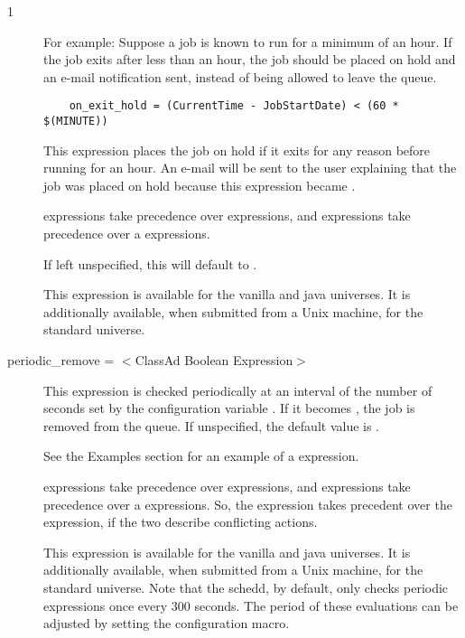 \begin{ManPage}{\label{man-condor-submit}}{1}
\begin{description}
For example:
Suppose a job is known to run for a minimum of an hour.
If the job exits after less than an hour, the job should be placed on
hold and an e-mail notification sent,
instead of being allowed to leave the queue.

\begin{verbatim}
	on_exit_hold = (CurrentTime - JobStartDate) < (60 * $(MINUTE))
\end{verbatim}

This expression places the job on hold if it exits for any reason
before running for an hour. An e-mail will be sent to the user explaining
that the job was placed on hold because this expression became .

 expressions take
precedence over  expressions,
and  expressions take
precedence over a  expressions.

If left unspecified, this will default to .

This expression is available for the vanilla and java universes.
It is additionally available, when submitted from a Unix machine,
for the standard universe.


\item[periodic\_remove = $<$ClassAd Boolean Expression$>$]
This expression is checked periodically at an interval of
the number of seconds set by
the configuration variable .
If it becomes , the job is removed from the queue.
If unspecified, the default value is .

See the Examples section for an example of a 
expression. 

 expressions take
precedence over  expressions,
and  expressions take
precedence over a  expressions.
So, the  expression takes precedent over
the  expression,
if the two describe conflicting actions.

This expression is available for the vanilla and java universes.
It is additionally available, when submitted from a Unix machine,
for the standard universe.  Note that the schedd, by default, only checks
periodic expressions once every 300 seconds.  The period of
these evaluations can be adjusted by setting the
 configuration macro.


\end{description}
\end{ManPage}
